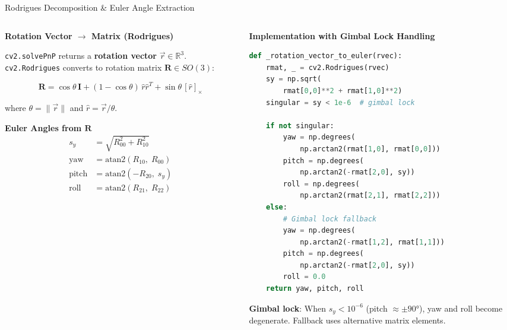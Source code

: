 \documentclass[aspectratio=169,10pt]{beamer}
\begin{document}
\begin{frame}{Rodrigues Decomposition \& Euler Angle Extraction}
\begin{columns}[T]
\begin{column}{0.48\textwidth}
\textbf{Rotation Vector $\rightarrow$ Matrix (Rodrigues)}

\vspace{4pt}
\footnotesize
\texttt{cv2.solvePnP} returns a \textbf{rotation vector} $\vec{r} \in \mathbb{R}^3$.
\texttt{cv2.Rodrigues} converts to rotation matrix $\mathbf{R} \in SO(3)$:

\begin{equation*}
\mathbf{R} = \cos\theta\, \mathbf{I} + (1 - \cos\theta)\, \hat{r}\hat{r}^T + \sin\theta\, [\hat{r}]_\times
\end{equation*}

where $\theta = \|\vec{r}\|$ and $\hat{r} = \vec{r}/\theta$.

\vspace{8pt}
\textbf{Euler Angles from $\mathbf{R}$}
\begin{align*}
s_y &= \sqrt{R_{00}^2 + R_{10}^2} \\[4pt]
\text{yaw} &= \text{atan2}(R_{10},\; R_{00}) \\[2pt]
\text{pitch} &= \text{atan2}(-R_{20},\; s_y) \\[2pt]
\text{roll} &= \text{atan2}(R_{21},\; R_{22})
\end{align*}
\end{column}

\begin{column}{0.48\textwidth}
\textbf{Implementation with Gimbal Lock Handling}

\vspace{4pt}
\begin{lstlisting}[language=Python]
def _rotation_vector_to_euler(rvec):
    rmat, _ = cv2.Rodrigues(rvec)
    sy = np.sqrt(
        rmat[0,0]**2 + rmat[1,0]**2)
    singular = sy < 1e-6  # gimbal lock

    if not singular:
        yaw = np.degrees(
            np.arctan2(rmat[1,0], rmat[0,0]))
        pitch = np.degrees(
            np.arctan2(-rmat[2,0], sy))
        roll = np.degrees(
            np.arctan2(rmat[2,1], rmat[2,2]))
    else:
        # Gimbal lock fallback
        yaw = np.degrees(
            np.arctan2(-rmat[1,2], rmat[1,1]))
        pitch = np.degrees(
            np.arctan2(-rmat[2,0], sy))
        roll = 0.0
    return yaw, pitch, roll
\end{lstlisting}

\vspace{2pt}
\footnotesize
\textbf{Gimbal lock}: When $s_y < 10^{-6}$ (pitch $\approx \pm 90°$), yaw and roll become degenerate. Fallback uses alternative matrix elements.
\end{column}
\end{columns}
\end{frame}
\end{document}
